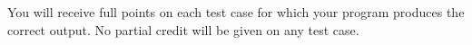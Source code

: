 You will receive full points on each test case for which your program produces the correct output. No partial credit will be given on any test case.
